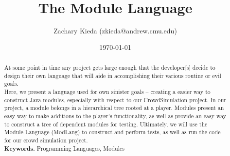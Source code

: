 \documentclass[11pt]{article}
\begin{document}
\title{The Module Language}
\author{Zachary Kieda (zkieda@andrew.cmu.edu)}
\date{\today}
\maketitle
\begin{abstract}
\setlength\parindent{0pt}\noindent 

At some point in time any project gets large enough that the developer[s] decide to design their own language that will aide in accomplishing their various routine or evil goals.\\

Here, we present a language used for own sinister goals -- creating a easier way to construct Java modules, especially with respect to our CrowdSimulation project. In our project, a module belongs in a hierarchical tree rooted at a player. Modules present an easy way to make additions to the player's functionality, as well as provide an easy way to construct a tree of dependent modules for testing. Ultimately, we will use the Module Language (ModLang) to construct and perform tests, as well as run the code for our crowd simulation project.\\


\textbf{Keywords.} Programming Languages, Modules
\end{abstract}
\pagebreak
\end{document}
